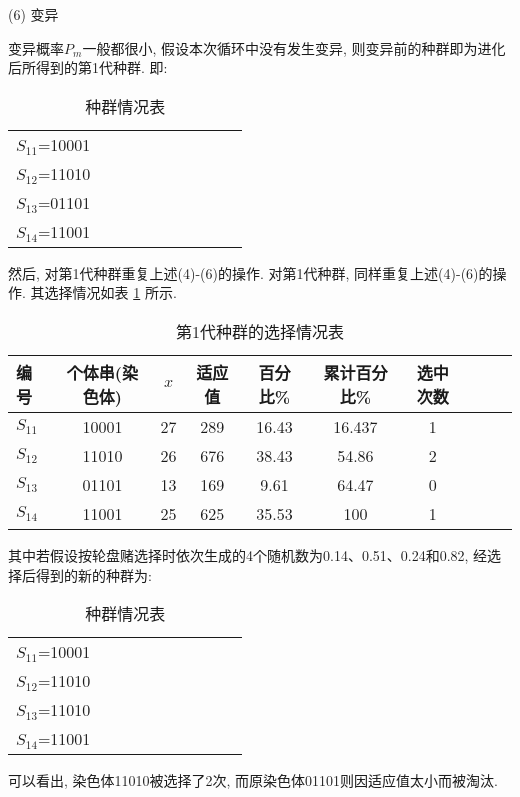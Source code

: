  (6) 变异

变异概率$P_m$一般都很小, 假设本次循环中没有发生变异, 则变异前的种群即为进化后所得到的第1代种群. 即:
\begin{table} [H]
\caption{种群情况表}
\vspace{-0.6cm}
\begin{center}
\begin{tabular} {lccccccccc}
\hline
    $S_{11}$=10001\\
    $S_{12}$=11010\\
    $S_{13}$=01101\\
    $S_{14}$=11001\\
\hline
\end{tabular}
\end{center}\vspace{-0.4cm}
\end{table}

然后, 对第1代种群重复上述(4)-(6)的操作.
对第1代种群, 同样重复上述(4)-(6)的操作. 其选择情况如表 \ref{AI_table2019112807} 所示.
\begin{table} [H]
\caption{第1代种群的选择情况表}
\vspace{-0.6cm}
\begin{center}
\begin{tabular} {lccccccccc}
  \hline
编号	&个体串(染色体)&	 $x$	&适应值	&百分比\%	&累计百分比\%	&选中次数\\
  \hline
$S_{11}$	&10001	&27	&289	&16.43	&16.437	&1\\
$S_{12}$&	11010	&26	&676&38.43	&54.86	&2\\
$S_{13}$&	01101	&13	&169	&9.61	&64.47	&0\\
$S_{14}$	&11001	&25	&625	&35.53	&100	&1\\
\hline
\end{tabular}
\end{center}
\label{AI_table2019112807}
\vspace{-0.4cm}
\end{table}
其中若假设按轮盘赌选择时依次生成的4个随机数为0.14、0.51、0.24和0.82, 经选择后得到的新的种群为:
\begin{table} [H]
\caption{种群情况表}
\vspace{-0.6cm}
\begin{center}
    \begin{tabular} {lccccccccc}
    \hline
        $S_{11}$=10001\\
        $S_{12}$=11010\\
        $S_{13}$=11010\\
        $S_{14}$=11001\\
    \hline
    \end{tabular}
    \end{center}
    \vspace{-0.4cm}
\end{table}
可以看出, 染色体11010被选择了2次, 而原染色体01101则因适应值太小而被淘汰.

